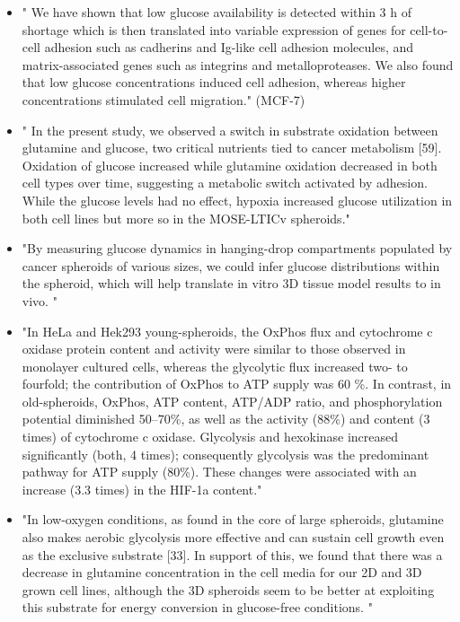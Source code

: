 \documentclass[11pt,a4paper]{article}
\begin{document}
\begin{itemize}
\item "  We have shown that low glucose availability is detected within 3 h of shortage which is then translated into variable expression of genes for cell-to-cell adhesion such as cadherins and Ig-like cell adhesion molecules, and matrix-associated genes such as integrins and metalloproteases. We also found that low glucose concentrations induced cell adhesion, whereas higher concentrations stimulated cell migration." (MCF-7)\cite{Aftab2021}

\item " In the present study, we observed a switch in substrate oxidation between glutamine and glucose, two critical nutrients tied to cancer metabolism [59]. Oxidation of glucose increased while glutamine oxidation decreased in both cell types over time, suggesting a metabolic switch activated by adhesion. While the glucose levels had no effect, hypoxia increased glucose utilization in both cell lines but more so in the MOSE-LTICv spheroids." \cite{Compton2022}

\item "By measuring glucose dynamics in hanging-drop compartments populated by cancer spheroids of various sizes, we could infer glucose distributions within the spheroid, which will help translate in vitro 3D tissue model results to in vivo. "\cite{Rousset2022}

\item "In HeLa and Hek293 young-spheroids, the OxPhos flux and cytochrome c oxidase protein content and activity were similar to those observed in monolayer cultured cells, whereas the glycolytic flux increased two- to fourfold; the contribution of OxPhos to ATP supply was 60 \%. In contrast, in old-spheroids, OxPhos, ATP content, ATP/ADP ratio, and phosphorylation potential diminished 50–70\%, as well as the activity (88\%) and content (3 times) of cytochrome c oxidase. Glycolysis and hexokinase increased significantly (both, 4 times); consequently glycolysis was the predominant pathway for ATP supply (80\%). These changes were associated with an increase
(3.3 times) in the HIF-1a content."\cite{Rodriguez2008}

\item "In low-oxygen conditions, as found in the core of large spheroids, glutamine also makes aerobic glycolysis more effective and can sustain cell growth even as the exclusive substrate [33]. In support of this, we found that there was a decrease in glutamine concentration in the cell media for our 2D and 3D grown cell lines, although the 3D spheroids seem to be better at exploiting this substrate for energy conversion in glucose-free conditions. "\cite{Tidwell2022}
\end{itemize}
\end{document}
